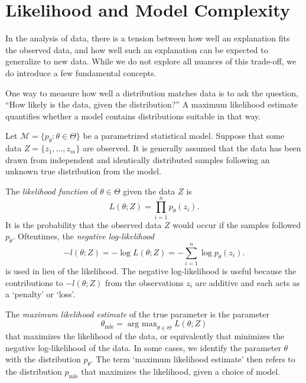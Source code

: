 \documentclass[cclicense]{hmcthesis}
\providecommand*{\ms}{\mathcal M}
\DeclareMathOperator*{\argmax}{arg\ max}
\newcommand*{\mle}{\mathrm{mle}}
\numberwithin{equation}{chapter}
\numberwithin{thmcounter}{chapter}
\begin{document}
\section{Likelihood and Model Complexity}
    In the analysis of data, there is a tension between how well an explanation
    fits the observed data, and how well such an explanation can be expected to
    generalize to new data.  While we do not explore all nuances of this
    trade-off, we do introduce a few fundamental concepts.

    One way to measure how well a distribution matches data is to ask the
    question, ``How likely is the data, given the distribution?''  A maximum
    likelihood estimate quantifies whether a model contains distributions
    suitable in that way.

    Let $\ms = \{p_\theta : \theta \in \Theta\}$ be a parametrized statistical
    model.  Suppose that some data $Z = \{z_1, \ldots, z_m\}$ are observed.  It
    is generally assumed that the data has been drawn from independent and
    identically distributed samples following an unknown true distribution from
    the model.
    
    \begin{definition}
    The \emph{likelihood function} of $\theta \in \Theta$ given the data $Z$ is
    \[
        L(\theta; Z) = \prod_{i=1}^n p_\theta(z_i).
    \]
    It is the probability that the observed data $Z$ would occur if the samples
    followed $p_\theta$.  Oftentimes, the \emph{negative log-likelihood}
    \begin{equation}
        -l(\theta; Z) = -\log L(\theta; Z) = -\sum_{i=1}^n \log p_\theta(z_i).
        \label{eq:negloglik}
    \end{equation}
    is used in lieu of the likelihood.  The negative log-likelihood is useful
    because the contributions to $-l(\theta; Z)$ from the observations $z_i$ are
    additive and each acts as a `penalty' or `loss'.
    \end{definition}
    \begin{definition}
    The \emph{maximum likelihood estimate} of the true parameter is the
    parameter 
    \[
        \theta_\mle = \argmax_{\theta \in \Theta} L(\theta; Z)
    \]
    that maximizes the likelihood of the data, or equivalently that minimizes
    the negative log-likelihood of the data.  In some cases, we identify the
    parameter $\theta$ with the distribution $p_\theta$. The term `maximum
    likelihood estimate' then refers to the distribution $p_\mle$ that maximizes
    the likelihood, given a choice of model.
    \end{definition}
\end{document}
